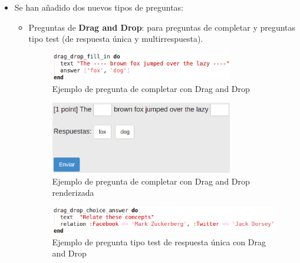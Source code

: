 \begin{itemize}
\begin{itemize}
  \end{itemize}
  \newpage
  
  \item Se han a\~{n}adido dos nuevos tipos de preguntas:
  \begin{itemize}
    \item Preguntas de {\bfseries Drag and Drop}: para preguntas de completar y preguntas tipo test (de respuesta \'unica
    y multirrespuesta).
    \begin{figure}[!th]
    \begin{center}
    \includegraphics[width=0.8\textwidth]{images/dd1.eps}
    \caption{Ejemplo de pregunta de completar con Drag and Drop}
    \label{fig:dd1}
    \end{center}
    \end{figure}
    
    \begin{figure}[!th]
    \begin{center}
    \includegraphics[width=0.8\textwidth]{images/dd1r.eps}
    \caption{Ejemplo de pregunta de completar con Drag and Drop renderizada}
    \label{fig:dd1r}
    \end{center}
    \end{figure}
    \newpage
    
    \begin{figure}[!th]
    \begin{center}
    \includegraphics[width=1\textwidth]{images/dd2.eps}
    \caption{Ejemplo de pregunta tipo test de respuesta \'unica con Drag and Drop}
    \label{fig:dd2}
    \end{center}
    \end{figure}
    

\end{itemize}
\end{itemize}
